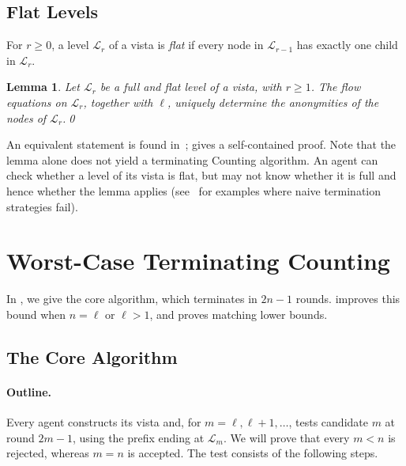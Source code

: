 \documentclass[11pt]{article}
\newtheorem{lemma}{Lemma}
\begin{document}
\subsection{Flat Levels}

For \(r\geq0\), a level \(\mathcal L_r\) of a vista is \emph{flat} if every node in
\(\mathcal L_{r-1}\) has exactly one child in \(\mathcal L_r\).

\begin{lemma}
\label{lem:flat-anonymities}
Let \(\mathcal L_r\) be a full and flat level of a vista, with
\(r\geq1\).  The flow equations on \(\mathcal L_r\), together with \(\ell\),
uniquely determine the anonymities of the nodes of \(\mathcal L_r\).\qed
\end{lemma}

An equivalent statement is found in~\cite[Section~3.3]{VIG24};  gives a self-contained proof. Note that the lemma alone does not yield a terminating Counting algorithm. An agent can check whether a level of its vista is flat, but may not know whether it is full and hence whether the lemma applies (see~\cite[Section~5.1]{DLV26} for examples where naive termination strategies fail).

\section{Worst-Case Terminating Counting}
\label{sec:algorithm}

In , we give the core algorithm, which terminates in
\(2n-1\) rounds.   improves this bound when \(n=\ell\)
or \(\ell>1\), and proves matching lower bounds.

\subsection{The Core Algorithm}
\label{sec:core-algorithm}

\paragraph{Outline.}
Every agent constructs its vista and,
for \(m=\ell,\ell+1,\ldots\), tests candidate \(m\) at round \(2m-1\), using the prefix
ending at \(\mathcal L_m\).  We will prove that every \(m<n\) is rejected,
whereas \(m=n\) is accepted.  The test consists of the following steps.
\end{document}

